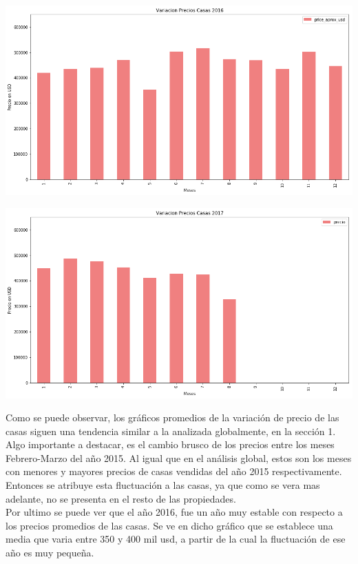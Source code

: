 \documentclass[a4paper, 10pt]{article}
\begin{document}
			\begin{center}
   		    		\includegraphics[width=\textwidth]{images/vCasa2016}
			\end{center}

			\begin{center}
   		    		\includegraphics[width=\textwidth]{images/vCasa2017}
			\end{center}

			Como se puede observar, los gráficos promedios de la variación de precio de las casas siguen 				una tendencia similar a la analizada globalmente, en la sección 1. Algo importante a destacar, 				es el cambio brusco de los precios entre los meses Febrero-Marzo del año 2015. Al igual que en 				el análisis global, estos son los meses con menores y mayores precios de casas vendidas del año 			2015 respectivamente. Entonces se atribuye esta fluctuación a las casas, ya que como se vera 				mas adelante, no se presenta en el resto de las propiedades.
			\\
			Por ultimo se puede ver que el año 2016, fue un año muy estable con respecto a los precios 					promedios de las casas. Se ve en dicho gráfico que se establece una media que varia entre 350 y 			400 mil usd, a partir de la cual la fluctuación de ese año es muy pequeña.
\end{document}
